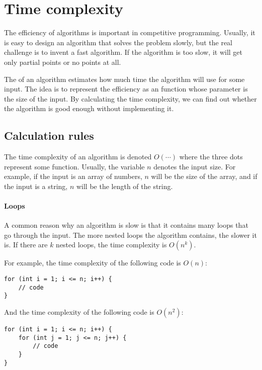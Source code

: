 \chapter{Time complexity}


The efficiency of algorithms is important in competitive programming.
Usually, it is easy to design an algorithm
that solves the problem slowly,
but the real challenge is to invent a
fast algorithm.
If the algorithm is too slow, it will get only
partial points or no points at all.

The  of an algorithm
estimates how much time the algorithm will use
for some input.
The idea is to represent the efficiency
as an function whose parameter is the size of the input.
By calculating the time complexity,
we can find out whether the algorithm is good enough
without implementing it.

\section{Calculation rules}

The time complexity of an algorithm
is denoted $O(\cdots)$
where the three dots represent some
function.
Usually, the variable $n$ denotes
the input size.
For example, if the input is an array of numbers,
$n$ will be the size of the array,
and if the input is a string,
$n$ will be the length of the string.

\subsubsection*{Loops}

A common reason why an algorithm is slow is
that it contains many loops that go through the input.
The more nested loops the algorithm contains,
the slower it is.
If there are $k$ nested loops,
the time complexity is $O(n^k)$.

For example, the time complexity of the following code is $O(n)$:
\begin{lstlisting}
for (int i = 1; i <= n; i++) {
    // code
}
\end{lstlisting}

And the time complexity of the following code is $O(n^2)$:
\begin{lstlisting}
for (int i = 1; i <= n; i++) {
    for (int j = 1; j <= n; j++) {
        // code
    }
}
\end{lstlisting}


